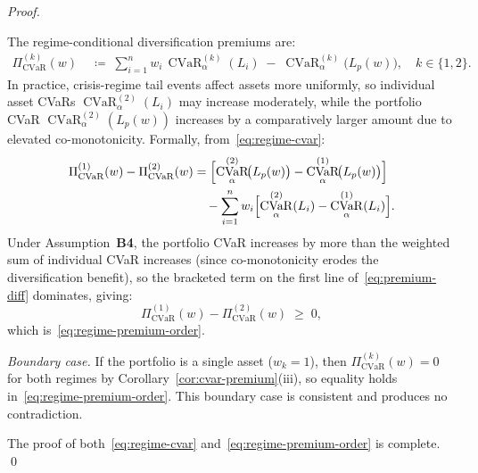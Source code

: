 \documentclass[12pt,openany]{book}
\newcommand{\bfw}{\mathbf{w}}
\DeclareMathOperator{\CVaR}{CVaR}
\numberwithin{equation}{chapter}
\theoremstyle{plain}
\theoremstyle{definition}
\theoremstyle{remark}
\def\bfw{w}%
\begin{document}
\begin{proof}
\begin{enumerate}[label=\textbf{Step \arabic*.}, leftmargin=*,
                  widest=Step 5., itemsep=1ex]
        The regime-conditional diversification premiums are:
        \begin{align}
          \Pi_{\mathrm{CVaR}}^{(k)}(\bfw)
          &\;\coloneqq\;
          \sum_{i=1}^n w_i\,\CVaR_\alpha^{(k)}(L_i)
          \;-\;
          \CVaR_\alpha^{(k)}\!\bigl(L_p(\bfw)\bigr),
          \quad k \in \{1,2\}.
          \label{eq:regime-premium-def}
        \end{align}
        In practice, crisis-regime tail events affect assets
        more uniformly, so individual asset CVaRs
        $\CVaR_\alpha^{(2)}(L_i)$ may increase moderately, while
        the portfolio CVaR $\CVaR_\alpha^{(2)}(L_p(\bfw))$ increases
        by a comparatively larger amount due to elevated
        co-monotonicity.  Formally, from~\eqref{eq:regime-cvar}:
        \begin{align}
          \Pi_{\mathrm{CVaR}}^{(1)}(\bfw)
          - \Pi_{\mathrm{CVaR}}^{(2)}(\bfw)
          &= \Bigl[
               \CVaR_\alpha^{(2)}\!\bigl(L_p(\bfw)\bigr)
               - \CVaR_\alpha^{(1)}\!\bigl(L_p(\bfw)\bigr)
             \Bigr]
          \notag \\
          &\quad
           - \sum_{i=1}^n w_i
             \Bigl[
               \CVaR_\alpha^{(2)}(L_i)
               - \CVaR_\alpha^{(1)}(L_i)
             \Bigr].
          \label{eq:premium-diff}
        \end{align}
        Under Assumption~\textbf{B4}, the portfolio CVaR
        increases by more than the weighted sum of individual
        CVaR increases (since co-monotonicity erodes the
        diversification benefit), so the bracketed
        term on the first line of~\eqref{eq:premium-diff}
        dominates, giving:
        \begin{equation}
          \Pi_{\mathrm{CVaR}}^{(1)}(\bfw)
          - \Pi_{\mathrm{CVaR}}^{(2)}(\bfw)
          \;\geq\; 0,
        \end{equation}
        which is~\eqref{eq:regime-premium-order}.

        \medskip
        \noindent\textit{Boundary case.}
        If the portfolio is a single asset ($w_k = 1$), then
        $\Pi_{\mathrm{CVaR}}^{(k)}(\bfw) = 0$ for both regimes
        by Corollary~\ref{cor:cvar-premium}(iii), so
        equality holds in~\eqref{eq:regime-premium-order}.
        This boundary case is consistent and produces no
        contradiction.

\end{enumerate}

\noindent The proof of both~\eqref{eq:regime-cvar}
and~\eqref{eq:regime-premium-order} is complete.
\qed
\end{proof}
\end{document}
